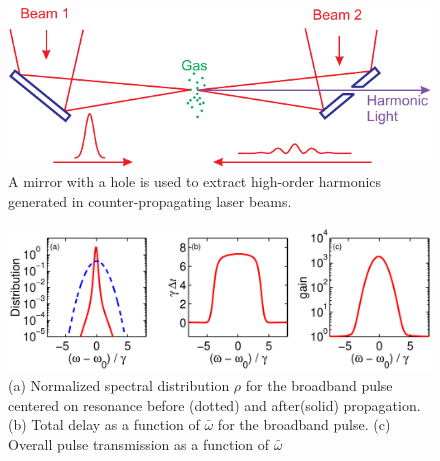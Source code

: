 \begin{figure}
    \centerline{\includegraphics{Graphic1}}
    \caption[Setup for using counter-propagating light]{\label{fig:MirrorDiagram} A mirror with a hole is used to extract high-order harmonics generated in
    counter-propagating laser beams.}
\end{figure}

\begin{figure}
\centerline{\includegraphics[width=5.5in]{Figure3}} \caption[Group
delay for broadband pulses]{\label{fig:DelayPlot} (a) Normalized
spectral distribution $\rho$ for the broadband pulse centered on
resonance before (dotted) and after(solid) propagation. (b) Total
delay as a function of $\bar{\omega}$ for the broadband pulse. (c)
Overall pulse transmission as a function of $\bar{\omega}$}
\end{figure}

